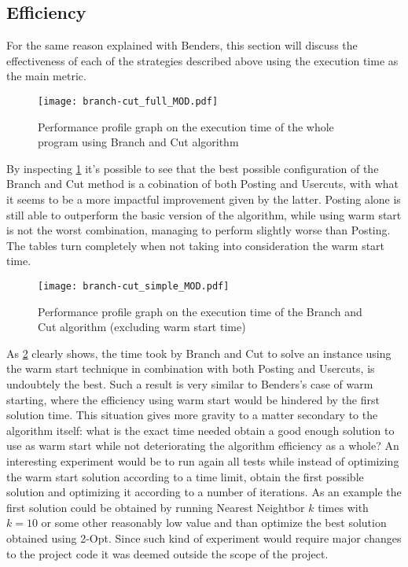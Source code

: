 \subsection{Efficiency}
For the same reason explained with Benders, this section will discuss the effectiveness of each of the strategies described above using the execution time as the main metric.
\begin{figure}[htbp]
	\centering
	\texttt{[image: branch-cut\_full\_MOD.pdf]}
	\caption{Performance profile graph on the execution time of the whole program using Branch and Cut algorithm \label{fig:branchCutFull}}
\end{figure}
By inspecting \figurename{ \ref{fig:branchCutFull}} it's possible to see that the best possible configuration of the Branch and Cut method is a cobination of both Posting and Usercuts, with what it seems to be a more impactful improvement given by the latter.
Posting alone is still able to outperform the basic version of the algorithm, while using warm start is not the worst combination, managing to perform slightly worse than Posting.
The tables turn completely when not taking into consideration the warm start time.
\begin{figure}[htbp]
	\centering
	\texttt{[image: branch-cut\_simple\_MOD.pdf]}
	\caption{Performance profile graph on the execution time of the Branch and Cut algorithm (excluding warm start time) \label{fig:branchCutSimple}}
\end{figure}
As \figurename{ \ref{fig:branchCutSimple}} clearly shows, the time took by Branch and Cut to solve an instance using the warm start technique in combination with both Posting and Usercuts, is undoubtely the best.
Such a result is very similar to Benders's case of warm starting, where the efficiency using warm start would be hindered by the first solution time.
This situation gives more gravity to a matter secondary to the algorithm itself: what is the exact time needed obtain a good enough solution to use as warm start while not deteriorating the algorithm efficiency as a whole?
An interesting experiment would be to run again all tests while instead of optimizing the warm start solution according to a time limit, obtain the first possible solution and optimizing it according to a number of iterations.
As an example the first solution could be obtained by running Nearest Neightbor $k$ times with $k=10$ or some other reasonably low value and than optimize the best solution obtained using 2-Opt.
Since such kind of experiment would require major changes to the project code it was deemed outside the scope of the project. 

